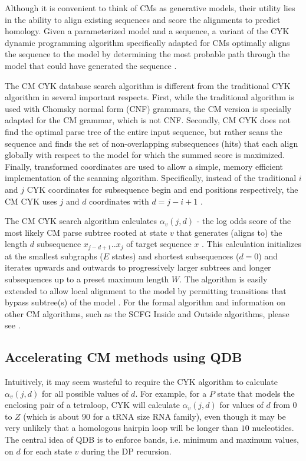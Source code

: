 \documentclass[11pt]{article}
\begin{document}
Although it is convenient to think of CMs as generative models, their
utility lies in the ability to align existing sequences and score
the alignments to predict homology. Given a parameterized model
and a sequence, a variant of the CYK dynamic programming algorithm
specifically adapted for CMs optimally aligns the sequence to the
model by determining the most probable path through the model that
could have generated the sequence \cite{Durbin98}. 

The CM CYK database search algorithm is different from the traditional
CYK algorithm \cite{Kasami65, Younger67, HopcroftUllman79} in several
important respects. First, while the traditional algorithm is used with
Chomsky normal form (CNF) grammars, the CM version is specially adapted
for the CM grammar, which is not CNF\@. Secondly, CM CYK does not find
the optimal parse tree of the entire input sequence, but
rather scans the sequence and finds the set of
non-overlapping subsequences (hits) that each align globally with
respect to the model for which the summed score is maximized. Finally, 
transformed coordinates are used to allow a simple, memory efficient
implementation of the scanning algorithm. Specifically, instead of the
traditional $i$ and $j$ CYK coordinates for subsequence begin and end
positions respectively, the CM CYK uses $j$ and $d$ coordinates with
$d = j-i+1$ \cite{Durbin98}.

The CM CYK search algorithm calculates $\alpha_v(j,d)$ - the log odds score
of the most likely CM parse subtree rooted at state $v$ that generates
(aligns to) the length $d$ subsequence $x_{j-d+1}..x_j$ of target sequence
$x$ \cite{Durbin98}. This calculation initializes at the smallest
subgraphs ($E$ states) and shortest subsequences ($d=0$) and iterates
upwards and outwards to progressively larger subtrees and longer
subsequences up to a preset maximum length $W$. 
The algorithm is easily extended to allow local alignment to the model
by permitting transitions that bypass subtree(s) of the model
\cite{KleinEddy03}. For the formal algorithm and information on other
CM algorithms, such as the SCFG Inside and Outside algorithms, please
see \cite{Durbin98}. 

\subsection{Accelerating CM methods using QDB}

Intuitively, it may seem wasteful to require the CYK algorithm to calculate
$\alpha_v(j,d)$ for all possible values of $d$. For example, for a 
$P$ state that models the enclosing pair of a tetraloop, CYK will
calculate $\alpha_v(j,d)$ for values of $d$ from $0$ to 
$Z$ (which is about $90$ for a tRNA size RNA family), even though it
may be very unlikely that a homologous hairpin loop will be longer
than $10$ nucleotides. The central idea of QDB is to enforce bands,
i.e. minimum and maximum values, on $d$ for each state $v$ during the
DP recursion. 
\end{document}
